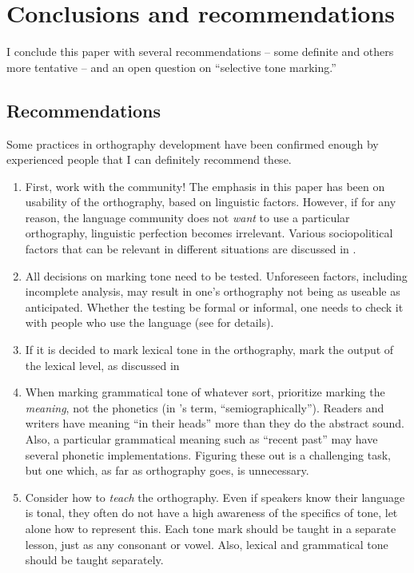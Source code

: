 \documentclass[output=paper]{langscibook}
\begin{document}
\section{Conclusions and recommendations}\label{sec:Conclusion:5}

I conclude this paper with several recommendations -- some definite and others more tentative -- and an open question on “selective tone marking.” 

\subsection{Recommendations}
\label{sec:Conclusions:Recommendations:1}
Some practices in orthography development have been confirmed enough by experienced people that I can definitely recommend these.

\begin{enumerate}[leftmargin=*]
\item First, work with the community! The emphasis in this paper has been on usability of the orthography, based on linguistic factors. However, if for any reason, the language community does not \textit{want} to use a particular orthography, linguistic perfection becomes irrelevant. Various sociopolitical factors that can be relevant in different situations are discussed in \citet{Cahill2014}.

\item All decisions on marking tone need to be tested. Unforeseen factors, including incomplete analysis, may result in one’s orthography not being as useable as anticipated. Whether the testing be formal or informal, one needs to check it with people who use the language (see \citealt{Karan2014} for details).

\item If it is decided to mark lexical tone in the orthography, mark the output of the lexical level, as discussed in  
\item When marking grammatical tone of whatever sort, prioritize marking the \textit{meaning}, not the phonetics (in \citeauthor{Roberts2013}’s \citeyear{Roberts2013} term, “semiographically”). Readers and writers have meaning “in their heads” more than they do the abstract sound. Also, a particular grammatical meaning such as “recent past” may have several phonetic implementations. Figuring these out is a challenging task, but one which, as far as orthography goes, is unnecessary.
\item Consider how to \textit{teach} the orthography. Even if speakers know their language is tonal, they often do not have a high awareness of the specifics of tone, let alone how to represent this. Each tone mark should be taught in a separate lesson, just as any consonant or vowel. Also, lexical and grammatical tone should be taught separately. 


\end{enumerate}
\end{document}
